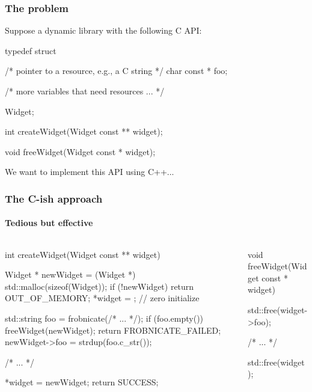 \documentclass{beamer}
\begin{document}
\begin{frame}[fragile]
\frametitle{The problem}
Suppose a dynamic library with the following C API:

\begin{C++}
typedef struct
{
    /* pointer to a resource, e.g., a C string */
    char const * foo;

    /* more variables that need resources ... */
    
} Widget;

int createWidget(Widget const ** widget);

void freeWidget(Widget const * widget);
\end{C++}

We want to implement this API using C++...
\end{frame}


\begin{frame}[fragile]
\frametitle{The C-ish approach}
\framesubtitle{Tedious but effective}
\begin{columns}
\begin{column}{0.45\textwidth}
\begin{TinyC++}
int createWidget(Widget const ** widget)
{
	Widget * newWidget =
			(Widget *) std::malloc(sizeof(Widget));
	if (!newWidget)
	{
		return OUT_OF_MEMORY;
	}
	*widget = {}; // zero initialize
    
	std::string	foo = frobnicate(/* ... */);
	if (foo.empty())
	{
		freeWidget(newWidget);
		return FROBNICATE_FAILED;
	}
	newWidget->foo = strdup(foo.c_str());
    
	/* ... */
    
	*widget = newWidget;
	return SUCCESS;
}
\end{TinyC++}
\end{column}
\begin{column}{0.45\textwidth}
\begin{TinyC++}
void freeWidget(Widget const * widget)
{
	std::free(widget->foo);
    
	/* ... */
    
	std::free(widget);
}
\end{TinyC++}
\end{column}
\end{columns}
\end{frame}

\end{document}
